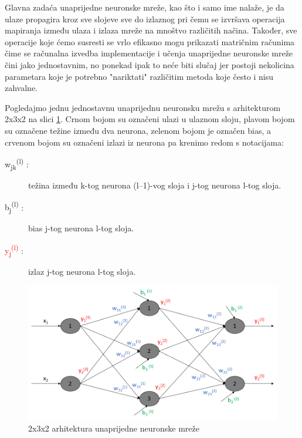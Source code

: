 \documentclass[times, utf8, zavrsni]{fer}
\begin{document}
Glavna zadaća unaprijedne neuronske mreže, kao što i samo ime nalaže, je da ulaze propagira kroz sve slojeve sve do izlaznog pri čemu se izvršava operacija mapiranja između ulaza i izlaza mreže na mnoštvo različitih načina. Također, sve operacije koje ćemo susresti se vrlo efikasno mogu prikazati matričnim računima čime se računalna izvedba implementacije i učenja unaprijedne neuronske mreže čini jako jednostavnim, no ponekad ipak to neće biti slučaj jer postoji nekolicina parametara koje je potrebno "nariktati" različitim metoda koje često i nisu zahvalne.

Pogledajmo jednu jednostavnu unaprijednu neuronsku mrežu s arhitekturom 2x3x2 na slici \ref{fig:ffann}.
Crnom bojom su označeni ulazi u ulaznom sloju, plavom bojom su označene težine između dva neurona, zelenom bojom je označen bias, a crvenom bojom su označeni izlazi iz neurona pa krenimo redom s notacijama:

\begin{description}
\item[\textcolor{myblue}{w\textsubscript{jk}\textsuperscript{(l)}} :] težina između k-tog neurona (l--1)-vog sloja i j-tog neurona l-tog sloja.
\item[\textcolor{mygreen}{b\textsubscript{j}\textsuperscript{(l)}} :] bias j-tog neurona l-tog sloja.
\item[\textcolor{red}{y\textsubscript{j}\textsuperscript{(l)}} :] izlaz j-tog neurona l-tog sloja.
\end{description}

\begin{figure}[H]
    \centering
    \includegraphics[scale=0.55]{img/ffann.png}
    \caption[Caption for LOF]{2x3x2 arhitektura unaprijedne neuronske mreže\footnotemark}
    \label{fig:ffann}
\end{figure}
\end{document}
